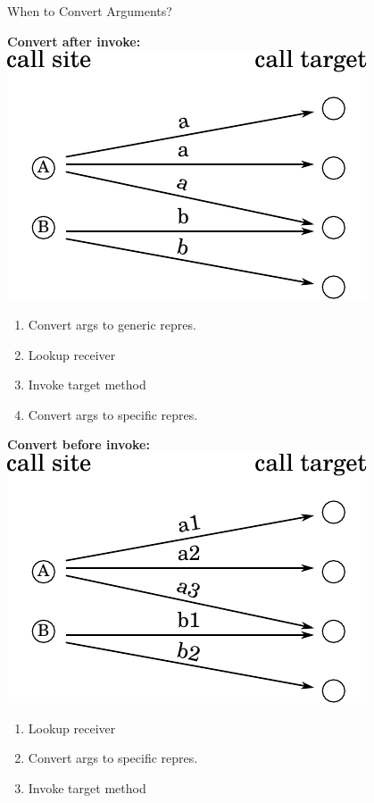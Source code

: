 \documentclass[xcolor=dvipsname]{beamer} %
\begin{document}
\begin{frame}{When to Convert Arguments?}
\begin{minipage}{0.49\textwidth}
\begin{table}
\centering
\textbf{Convert after invoke:} \newline \newline
\includegraphics[width=0.8\textwidth]{pic_regular.pdf}
\end{table}
\begin{enumerate}
	\item Convert args to generic repres.
	\item Lookup receiver
	\item Invoke target method
	\item Convert args to specific repres.
\end{enumerate}
\end{minipage} %
\begin{minipage}{0.49\textwidth}
\begin{table}
\centering
\textbf{Convert before invoke:} \newline \newline
\includegraphics[width=0.8\textwidth]{pic_calltarget.pdf}
\end{table}
\begin{enumerate}
	\item Lookup receiver
	\item Convert args to specific repres.
	\item Invoke target method \newline
\end{enumerate}
\end{minipage}
\end{frame}
\end{document}
